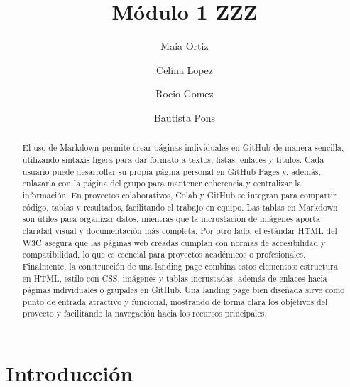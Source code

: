 \documentclass[runningheads]{llncs}
\begin{document}
%
\title{Módulo 1 ZZZ}
%
%
\author{Maia Ortiz\orcidID{ } \and
Celina Lopez\orcidID{ } \and
Rocio Gomez\orcidID{ } \and
Bautista Pons\orcidID{ }}
%
%
\institute{Universidad Nacional de Cuyo, Instituto de Ingeniería Industrial POBOX 5502 \and
\email{baupons@gmail.com}\\
\url{http://ingenieria.uncuyo.edu.ar/} %
}
%
\maketitle              %
%
\begin{abstract}
El uso de Markdown permite crear páginas individuales en GitHub de manera sencilla, utilizando sintaxis ligera para dar formato a textos, listas, enlaces y títulos. Cada usuario puede desarrollar su propia página personal en GitHub Pages y, además, enlazarla con la página del grupo para mantener coherencia y centralizar la información. En proyectos colaborativos, Colab y GitHub se integran para compartir código, tablas y resultados, facilitando el trabajo en equipo. Las tablas en Markdown son útiles para organizar datos, \cite{lopez2003latex} mientras que la incrustación de imágenes aporta claridad visual y documentación más completa. Por otro lado, el estándar HTML del W3C asegura que las páginas web creadas cumplan con normas de accesibilidad y compatibilidad, lo que es esencial para proyectos académicos o profesionales. Finalmente, la construcción de una landing page combina estos elementos: estructura en HTML,  \cite{sepulcre2024uso} estilo con CSS, imágenes y tablas incrustadas, además de enlaces hacia páginas individuales o grupales en GitHub. Una landing page bien diseñada sirve como punto de entrada atractivo y funcional, mostrando de forma clara los objetivos del proyecto y facilitando la navegación hacia los recursos principales.

\end{abstract}
%
%
%
\section{Introducción}
\end{document}
